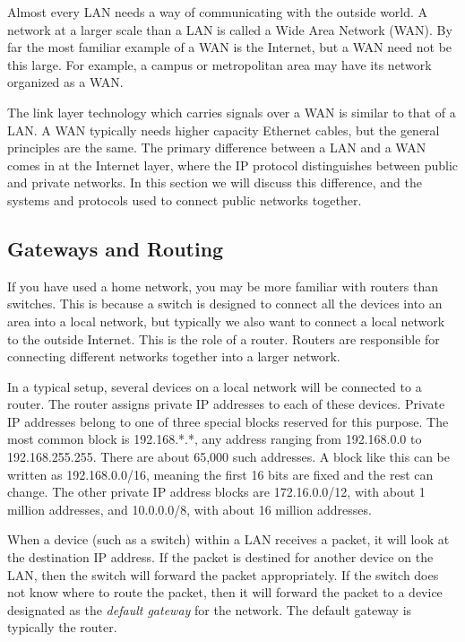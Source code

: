 Almost every LAN needs a way of communicating with the outside world. A network at a larger scale than a LAN is called a Wide Area Network (WAN). By far the most familiar example of a WAN is the Internet, but a WAN need not be this large. For example, a campus or metropolitan area may have its network organized as a WAN.

The link layer technology which carries signals over a WAN is similar to that of a LAN. A WAN typically needs higher capacity Ethernet cables, but the general principles are the same. The primary difference between a LAN and a WAN comes in at the Internet layer, where the IP protocol distinguishes between public and private networks. In this section we will discuss this difference, and the systems and protocols used to connect public networks together.

\subsection{Gateways and Routing}

If you have used a home network, you may be more familiar with routers than switches. This is because a switch is designed to connect all the devices into an area into a local network, but typically we also want to connect a local network to the outside Internet. This is the role of a router. Routers are responsible for connecting different networks together into a larger network.

In a typical setup, several devices on a local network will be connected to a router. The router assigns private IP addresses to each of these devices. Private IP addresses belong to one of three special blocks reserved for this purpose. The most common block is 192.168.*.*, any address ranging from 192.168.0.0 to 192.168.255.255. There are about 65,000 such addresses. A block like this can be written as 192.168.0.0/16, meaning the first 16 bits are fixed and the rest can change. The other private IP address blocks are 172.16.0.0/12, with about 1 million addresses, and 10.0.0.0/8, with about 16 million addresses.

When a device (such as a switch) within a LAN receives a packet, it will look at the destination IP address. If the packet is destined for another device on the LAN, then the switch will forward the packet appropriately. If the switch does not know where to route the packet, then it will forward the packet to a device designated as the \emph{default gateway} for the network. The default gateway is typically the router.

